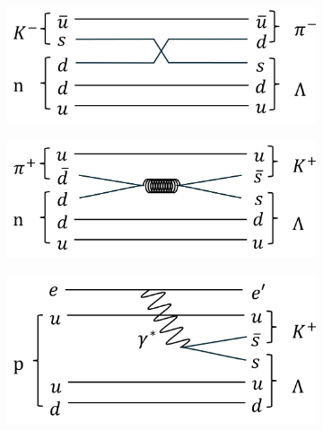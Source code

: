 \documentclass[a4paper,11pt,uplatex]{jsbook}
\begin{document}
\begin{figure}[b]
  \centering
  \begin{subfigure}[b]{0.47\linewidth}
    \centering
    \includegraphics[width=\linewidth]{image/1-Kpi.png}
  \end{subfigure}
  \hfill
  \begin{subfigure}[b]{0.47\linewidth}
    \centering
    \includegraphics[width=\linewidth]{image/1-piK.png}
  \end{subfigure}
  \begin{subfigure}[b]{0.5\linewidth}
    \centering
    \includegraphics[width=\linewidth]{image/1-eeK.png}
  \end{subfigure}
  \caption[主なハイパー核生成反応のファインマンダイアグラム]{}
\end{figure}
\end{document}
